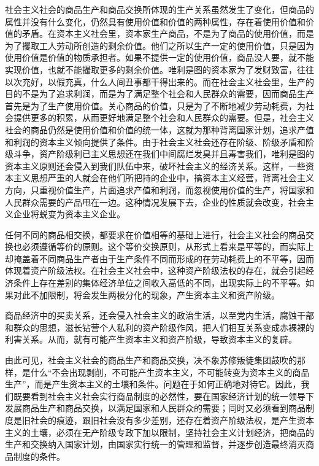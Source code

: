 \documentclass{book}
\begin{document}
社会主义社会的商品生产和商品交换所体现的生产关系虽然发生了变化，但商品的属性并没有什么变化，仍然具有使用价值和价值的两种属性，存在着使用价值和价值的矛盾。在资本主义社会里，资本家生产商品，不是为了商品的使用价值，而是为了攫取工人劳动所创造的剩余价值。他们之所以生产一定的使用价值，只是因为使用价值是价值的物质承担者。如果不提供一定的使用价值，商品没人要，就不能实现价值，也就不能撮取更多的剩余价值。唯利是图的资本家为了发财致富，往往以次充好，以假充真，什么人间丑事都干得出来的。而在社会主义社会里，生产的目的不是为了追求利润，而是为了满足整个社会和人民群众的需要，因而商品生产首先是为了生产使用价值。关心商品的价值，只是为了不断地减少劳动耗费，为社会提供更多的积累，从而更好地满足整个社会和人民群众的需要。但是，社会主义社会的商品仍然是使用价值和价值的统一体，这就为那种背离国家计划，追求产值和利润的资本主义倾向提供了条件。由于社会主义社会还存在阶级、阶级矛盾和阶级斗争，资产阶级利已主义思想还在我们中间腐烂发臭并且毒害我们，唯利是图的资本主义原则还会侵入到我们队伍中来，破坏社会主义的经济关系。这样，一些资本主义思想严重的人就会在他们所把持的企业中，搞资本主义经营，背离社会主义方向，只重视价值生产，片面追求产值和利润，而忽视使用价值的生产，将国家和人民群众需要的产品甩在一边。这种情况发展下去，企业的性质就会改变，社会主义企业将蜕变为资本主义企业。

任何不同的商品相交换，都要求在价值相等的基础上进行，社会主义社会的商品交换也必须遵循等价的原则。这个等价交换原则，从形式上看来是平等的，而实际上却掩盖着不同商品生产者由于生产条件不同而形成的在劳动耗费上的不平等，因而体现着资产阶级法权。在社会主义社会中，这种资产阶级法权的存在，就会引起经济条件上存在差别的集体经济单位之间收入高低的不同，出现实际上的不平等。如果对此不加限制，将会发生两极分化的现象，产生资本主义和资产阶级。

商品经济中的买卖关系，还会侵入社会主义的政治生活，以至党内生活，腐蚀干部和群众的思想，滋长钻营个人私利的资产阶级作风，把人们相互关系变成赤裸裸的利害关系。从而，就有可能产生资本主义和资产阶级，导致资本主义的复辟。

由此可见，社会主义社会的商品生产和商品交换，决不象苏修叛徒集团鼓吹的那样，是什么“不会出现剥削，不可能产生资本主义，不可能转变为资本主义的商品生产”，而是产生资本主义的土壤和条件。问题在于如何正确地对待它。因此，我们既要看到社会主义社会实行商品制度的必然性，要在国家经济计划的统一领导下发展商品生产和商品交换，以满足国家和人民群众的需要；同时又必须看到商品制度是旧社会的痕迹，跟旧社会没有多少差别，还存在着资产阶级法权，是产生资本主义的土壤，必须在无产阶级专政下加以限制，坚持社会主义计划经济，把商品的生产和交换纳入国家计划，由国家实行统一的管理和监督，并逐步创造最终消灭商品制度的条件。
\end{document}
